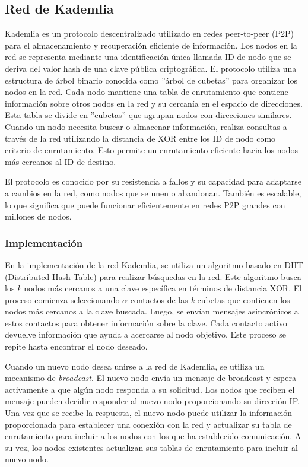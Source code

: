 \documentclass[10pt]{article} %
\begin{document}
	\subsection{Red de Kademlia}
	
	Kademlia \cite{kad} es un protocolo descentralizado utilizado en redes peer-to-peer (P2P) para el almacenamiento y recuperación eficiente de información. Los nodos en la red se representa mediante una identificación única llamada ID de nodo que se deriva del valor hash de una clave pública criptográfica. El protocolo utiliza una estructura de árbol binario conocida como ''árbol de cubetas'' para organizar los nodos en la red. Cada nodo mantiene una tabla de enrutamiento que contiene información sobre otros nodos en la red y su cercanía en el espacio de direcciones. Esta tabla se divide en ''cubetas'' que agrupan nodos con direcciones similares. Cuando un nodo necesita buscar o almacenar información, realiza consultas a través de la red utilizando la distancia de XOR entre los ID de nodo como criterio de enrutamiento. Esto permite un enrutamiento eficiente hacia los nodos más cercanos al ID de destino.
	
	El protocolo es conocido por su resistencia a fallos y su capacidad para adaptarse a cambios en la red, como nodos que se unen o abandonan. También es escalable, lo que significa que puede funcionar eficientemente en redes P2P grandes con millones de nodos.		
	

	
	\subsubsection{Implementaci\'on}
	
	En la implementación de la red Kademlia, se utiliza un algoritmo basado en DHT (Distributed Hash Table) para realizar búsquedas en la red. Este algoritmo busca los \textit{k} nodos más cercanos a una clave específica en términos de distancia XOR. El proceso comienza seleccionando $\alpha$ contactos de las \textit{k} cubetas que contienen los nodos más cercanos a la clave buscada. Luego, se envían mensajes asincrónicos a estos contactos para obtener información sobre la clave. Cada contacto activo devuelve información que ayuda a acercarse al nodo objetivo. Este proceso se repite hasta encontrar el nodo deseado.
	
	
	Cuando un nuevo nodo desea unirse a la red de Kademlia, se utiliza un mecanismo de \textit{broadcast}. El nuevo nodo envía un mensaje de broadcast y espera activamente a que alg\'un nodo responda a su solicitud. Los nodos que reciben el mensaje pueden decidir responder al nuevo nodo proporcionando su dirección IP. Una vez que se recibe la respuesta, el nuevo nodo puede utilizar la información proporcionada para establecer una conexión con la red y actualizar su tabla de enrutamiento para incluir a los nodos con los que ha establecido comunicación. A su vez,  los nodos existentes actualizan sus tablas de enrutamiento para incluir al nuevo nodo.
	
\end{document}
